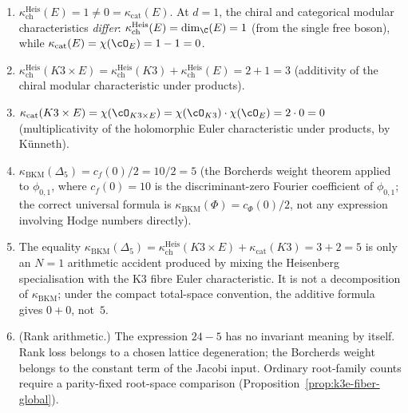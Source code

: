 \begin{proposition}
\begin{enumerate}[label=\textup{(\roman*)}]
 \item $\kappa_{\mathrm{ch}}^{\mathrm{Heis}}(E) = 1 \neq 0 = \kappa_{\mathrm{cat}}(E)$.
 At $d = 1$, the chiral and categorical modular characteristics \emph{differ}: $\kappa_{\mathrm{ch}}^{\mathrm{Heis}}(E) = \dim_\C(E) = 1$ (from the single free boson), while $\kappa_{\mathrm{cat}}(E) = \chi(\cO_E) = 1 - 1 = 0$.

 \item $\kappa_{\mathrm{ch}}^{\mathrm{Heis}}(K3 \times E) = \kappa_{\mathrm{ch}}^{\mathrm{Heis}}(K3) + \kappa_{\mathrm{ch}}^{\mathrm{Heis}}(E) = 2 + 1 = 3$ (additivity of the chiral modular characteristic under products).

 \item $\kappa_{\mathrm{cat}}(K3 \times E) = \chi(\cO_{K3 \times E}) = \chi(\cO_{K3}) \cdot \chi(\cO_E) = 2 \cdot 0 = 0$ (multiplicativity of the holomorphic Euler characteristic under products, by K\"unneth).

 \item $\kappa_{\mathrm{BKM}}(\Delta_5) = c_f(0)/2 = 10/2 = 5$ (the Borcherds weight theorem applied to $\phi_{0,1}$, where $c_f(0) = 10$ is the discriminant-zero Fourier coefficient of $\phi_{0,1}$; the correct universal formula is $\kappa_{\mathrm{BKM}}(\Phi)=c_\Phi(0)/2$, not any expression involving Hodge numbers directly).

 \item The equality
 $\kappa_{\mathrm{BKM}}(\Delta_5) =
 \kappa_{\mathrm{ch}}^{\mathrm{Heis}}(K3 \times E) + \kappa_{\mathrm{cat}}(K3)
 = 3 + 2 = 5$ is only an $N = 1$ arithmetic accident produced by mixing
 the Heisenberg specialisation with the K3 fibre Euler characteristic.
 It is not a decomposition of $\kappa_{\mathrm{BKM}}$; under the compact
 total-space convention, the additive formula gives $0+0$, not~$5$.

 \item \textup{(Rank arithmetic.)} The expression $24-5$ has no invariant meaning by itself. Rank loss belongs to a chosen lattice degeneration; the Borcherds weight belongs to the constant term of the Jacobi input. Ordinary root-family counts require a parity-fixed root-space comparison (Proposition~\textup{\ref{prop:k3e-fiber-global}}).
\end{enumerate}
\end{proposition}

